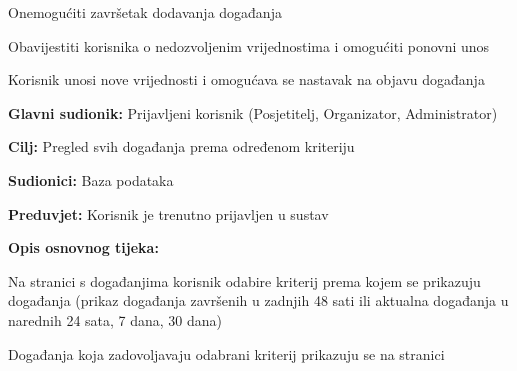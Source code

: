 \begin{packed_item}
\begin{packed_item}
\begin{packed_enum}
				\item Onemogućiti završetak dodavanja događanja
				\item Obavijestiti korisnika o nedozvoljenim vrijednostima i omogućiti ponovni unos 
				\item Korisnik unosi nove vrijednosti i omogućava se nastavak na objavu događanja
				
			\end{packed_enum}		
		\end{packed_item}
		
	\end{packed_item}
	
	
	\noindent {}
	\begin{packed_item}
		
		\item \textbf{Glavni sudionik:} Prijavljeni korisnik (Posjetitelj, Organizator, Administrator)
		\item  \textbf{Cilj:} Pregled svih događanja prema određenom kriteriju
		\item  \textbf{Sudionici:} Baza podataka
		\item  \textbf{Preduvjet:} Korisnik je trenutno prijavljen u sustav 
		\item  \textbf{Opis osnovnog tijeka:}
		
		\item[] \begin{packed_enum}
			
			\item Na stranici s događanjima korisnik odabire kriterij prema kojem se prikazuju događanja (prikaz događanja završenih u zadnjih 48 sati ili aktualna događanja u narednih 24 sata, 7 dana, 30 dana)
			\item Događanja koja zadovoljavaju odabrani kriterij prikazuju se na stranici
			
		\end{packed_enum}
		
	\end{packed_item}
	
	
